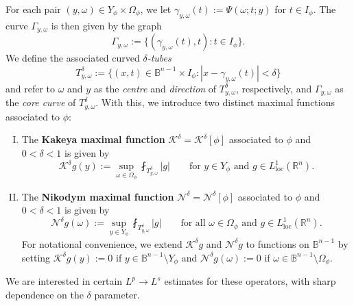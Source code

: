 \documentclass[reqno]{amsart}
\numberwithin{equation}{section}
\newcommand{\B}{\mathbb{B}}
\newcommand{\R}{\mathbb{R}}
\newcommand{\cK}{\mathcal{K}}
\newcommand{\cN}{\mathcal{N}}
\theoremstyle{plain}
\theoremstyle{definition}
\begin{document}
For each pair $(y, \omega)\in Y_{\phi} \times \Omega_{\phi}$, we let $\gamma_{y,\omega}(t) :=  \Psi(\omega; t ;y)$ for $t \in I_{\phi}$. The curve $\Gamma_{y,\omega}$ is then given by the graph 
\begin{equation*}
 \Gamma_{y,\omega}  := \big\{ (\gamma_{y,\omega}(t),t) : t \in I_{\phi} \big\}.
\end{equation*}
We define the associated curved \textit{$\delta$-tubes}
\begin{equation}\label{eq: delta tube}
T_{y,\omega}^{\delta}  := \big\{ (x,t) \in \B^{n-1} \times I_{\phi} : |x - \gamma_{y,\omega}(t)| < \delta \big\}
\end{equation}
and refer to $\omega$ and $y$ as the \textit{centre} and \textit{direction} of $T_{y,\omega}^{\delta}$, respectively, and $\Gamma_{y, \omega}$ as the \textit{core curve} of $T_{y,\omega}^{\delta}$. With this, we introduce two distinct maximal functions associated to $\phi$:


\begin{enumerate}[I)]
    \item The \textbf{Kakeya maximal function} $\cK^{\delta} = \cK^{\delta}[\phi]$ associated to $\phi$ and $0 < \delta < 1$ is given by
\begin{equation*}
\cK^{\delta}g(y) := \sup_{\omega \in \Omega_{\phi}} \fint_{ T_{y,\omega}^{\delta}} |g| \qquad \textrm{for $y \in Y_{\phi}$ and $g \in L^1_{\mathrm{loc}}(\R^n)$.}
\end{equation*}

    \item The \textbf{Nikodym maximal function} $\cN^{\delta} = \cN^{\delta}[\phi]$ associated to $\phi$ and $0 < \delta < 1$ is given by
\begin{equation*}
\cN^{\delta}g(\omega) := \sup_{y \in Y_{\phi}} \fint_{ T_{y,\omega}^{\delta}} |g| \qquad \textrm{for all $\omega \in \Omega_{\phi}$ and $g \in L^1_{\mathrm{loc}}(\R^n)$.}
\end{equation*}
For notational convenience, we extend $\cK^{\delta}g$ and $\cN^{\delta}g$ to functions on $\B^{n-1}$ by setting $\cK^{\delta}g(y) := 0$ if $y \in \B^{n-1} \setminus Y_{\phi}$ and $\cN^{\delta}g(\omega) := 0$ if $\omega \in \B^{n-1} \setminus \Omega_{\phi}$.
\end{enumerate}

We are interested in certain $L^p \to L^s$ estimates for these operators, with sharp dependence on the $\delta$ parameter. 
\end{document}
